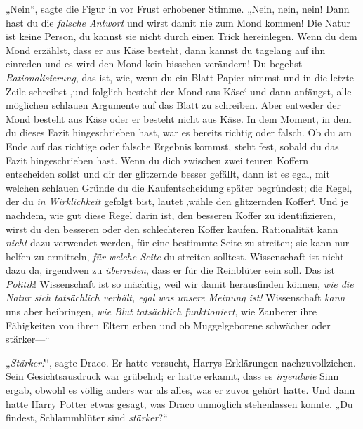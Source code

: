 „Nein“, sagte die Figur in vor Frust erhobener Stimme. „Nein, nein, nein! Dann hast du die \emph{falsche Antwort} und wirst damit nie zum Mond kommen! Die Natur ist keine Person, du kannst sie nicht durch einen Trick hereinlegen. Wenn du dem Mond erzählst, dass er aus Käse besteht, dann kannst du tagelang auf ihn einreden und es wird den Mond kein bisschen verändern! Du begehst \emph{Rationalisierung}, das ist, wie, wenn du ein Blatt Papier nimmst und in die letzte Zeile schreibst ‚und folglich besteht der Mond aus Käse‘ und dann anfängst, alle möglichen schlauen Argumente auf das Blatt zu schreiben. Aber entweder der Mond besteht aus Käse oder er besteht nicht aus Käse. In dem Moment, in dem du dieses Fazit hingeschrieben hast, war es bereits richtig oder falsch. Ob du am Ende auf das richtige oder falsche Ergebnis kommst, steht fest, sobald du das Fazit hingeschrieben hast. Wenn du dich zwischen zwei teuren Koffern entscheiden sollst und dir der glitzernde besser gefällt, dann ist es egal, mit welchen schlauen Gründe du die Kaufentscheidung später begründest; die Regel, der du \emph{in Wirklichkeit} gefolgt bist, lautet ‚wähle den glitzernden Koffer‘. Und je nachdem, wie gut diese Regel darin ist, den besseren Koffer zu identifizieren, wirst du den besseren oder den schlechteren Koffer kaufen. Rationalität kann \emph{nicht} dazu verwendet werden, für eine bestimmte Seite zu streiten; sie kann nur helfen zu ermitteln, \emph{für welche Seite} du streiten solltest. Wissenschaft ist nicht dazu da, irgendwen zu \emph{überreden}, dass er für die Reinblüter sein soll. Das ist \emph{Politik}! Wissenschaft ist so mächtig, weil wir damit herausfinden können, \emph{wie die Natur sich tatsächlich verhält, egal was unsere Meinung ist!} Wissenschaft \emph{kann} uns aber beibringen, \emph{wie Blut tatsächlich funktioniert}, wie Zauberer ihre Fähigkeiten von ihren Eltern erben und ob Muggelgeborene schwächer oder stärker—“

„\emph{Stärker!}“, sagte Draco. Er hatte versucht, Harrys Erklärungen nachzuvollziehen. Sein Gesichtsausdruck war grübelnd; er hatte erkannt, dass es \emph{irgendwie} Sinn ergab, obwohl es völlig anders war als alles, was er zuvor gehört hatte. Und dann hatte Harry Potter etwas gesagt, was Draco unmöglich stehenlassen konnte. „Du findest, Schlammblüter sind \emph{stärker}?“

